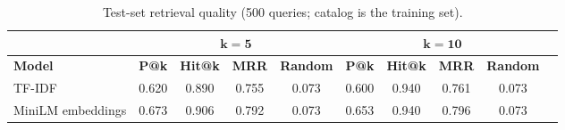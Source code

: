 \begin{table}[H]
  \centering\small
  \caption{Test-set retrieval quality (500 queries; catalog is the training set).}
  \label{tab:results}
  \begin{tabular}{|l|c|c|c|c|c|c|c|c|c|}
    \hline
    & \multicolumn{4}{|c|}{$\mathbf{k=5}$} & \multicolumn{4}{c|}{$\mathbf{k=10}$} \\
    \hline
    \textbf{Model} & \textbf{P@k} & \textbf{Hit@k} & \textbf{MRR} & \textbf{Random} & \textbf{P@k} & \textbf{Hit@k} & \textbf{MRR} & \textbf{Random} \\
    \hline
    TF-IDF            & 0.620 & 0.890 & 0.755 & 0.073 & 0.600 & 0.940 & 0.761 & 0.073 \\
    \hline
    MiniLM embeddings & 0.673 & 0.906 & 0.792 & 0.073 & 0.653 & 0.940 & 0.796 & 0.073 \\
    \hline
  \end{tabular}
\end{table}
